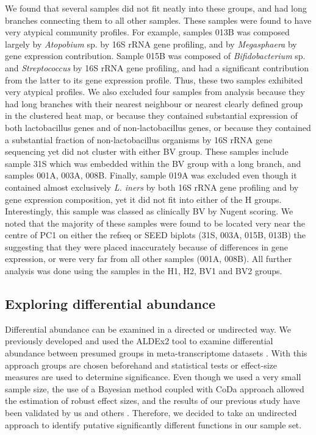 \documentclass[10pt,letterpaper]{article}
\begin{document}
We found that several samples did not fit neatly into these groups, and had long branches connecting them to all other samples. These samples were found to have very atypical community profiles. For example, samples 013B was composed largely by \emph{Atopobium} sp. by 16S rRNA gene profiling, and by \emph{Megasphaera} by gene expression contribution. Sample 015B was composed of \emph{Bifidobacterium} sp. and \emph{Streptococcus} by 16S rRNA gene profiling, and had a significant contribution from the latter to its gene expression profile. Thus, these two samples exhibited very atypical profiles.   We also excluded four samples from analysis because they had long branches with their nearest neighbour or nearest clearly defined group in the clustered heat map, or because they contained substantial expression of both lactobacillus genes and of non-lactobacillus genes,  or because they contained a substantial fraction of non-lactobacillus organisms by 16S rRNA gene sequencing yet did not cluster with either BV group. These samples include sample 31S which was embedded within the BV group with a long branch, and samples 001A, 003A, 008B. Finally, sample 019A was excluded even though it contained almost exclusively \emph{L. iners} by both 16S rRNA gene profiling and by gene expression composition, yet it did not fit into either of the H groups. Interestingly, this sample was classed as clinically BV by Nugent scoring. We noted that the majority  of these samples were found to be located very near the centre of PC1 on either the refseq or SEED biplots (31S, 003A, 015B, 013B) the suggesting that they were placed inaccurately because of differences in gene expression, or were very far from all other samples (001A, 008B). All further analysis was done using the samples in the H1, H2, BV1 and BV2 groups.  



\subsection{Exploring differential abundance}

Differential abundance can be examined in a directed or undirected way. We previously developed and used the ALDEx2 tool to examine differential abundance between presumed groups in meta-transcriptome datasets \cite{fernandes:2013, fernandes:2014}. With this approach groups are chosen beforehand and statistical tests or effect-size measures are used to determine significance. Even though we used a very small sample size, the use of a Bayesian method coupled with CoDa approach allowed the estimation of robust effect sizes, and the results of our previous study \cite{macklaim:2013} have been validated by us and others \cite{mcmillan:2015,nelson:2015vaginal}. Therefore, we decided to take an undirected approach to identify putative significantly different functions in our sample set. 
\end{document}
